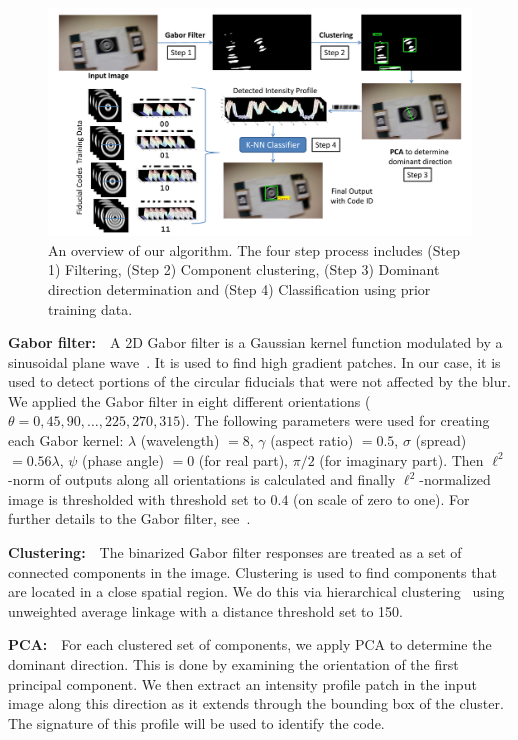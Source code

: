 \documentclass[10pt,twocolumn,letterpaper]{article}
\begin{document}
\begin{figure}[ht!]
  \centering
  \includegraphics[width=0.8\linewidth]{images/overall_flow.pdf}
  \caption{An overview of our algorithm.
    The four step process includes (Step 1) Filtering,
    (Step 2) Component clustering, (Step 3) Dominant direction determination
    and (Step 4) Classification using prior training data.}
  \label{fig:overall_flow}
\end{figure}

\textbf{Gabor filter:}~~A 2D Gabor filter is a Gaussian kernel function
modulated by a sinusoidal plane wave~\cite{Kruizinga:2002}. It is used to find
high gradient patches. In our case, it is used to detect portions
of the circular fiducials that were not affected by the blur.
We applied the Gabor filter in eight
different orientations ($\theta = 0, 45, 90, \ldots, 225, 270, 315$).  The
following parameters were used for creating each Gabor kernel: $\lambda$ (wavelength) $= 8$, $\gamma$
(aspect ratio) $= 0.5$, $\sigma$ (spread) $= 0.56\lambda$, $\psi$
(phase angle) $= 0$ (for real part), $\pi/2$ (for imaginary part).
Then $\ell^2$-norm of outputs along all orientations is calculated and finally
$\ell^2$-normalized image is thresholded with threshold set to $0.4$ (on scale of zero to
one).  For further details to the Gabor filter, see~\cite{Kruizinga:2002}.

\textbf{Clustering:}~~The binarized Gabor filter responses are
treated as a set of connected components in the image.   Clustering
is used to find components that are located in a close spatial region.  We do
this via hierarchical clustering~\cite{ALGLIB} using unweighted
average linkage with a distance threshold set to 150.

\textbf{PCA:}~~For each clustered set of components, we apply
PCA to determine the dominant direction.  This is done by examining
the orientation of the first principal component.  We then extract an
intensity profile patch in the input image along this direction as it
extends through the bounding box of the cluster. The signature of this
profile will be used to identify the code.
\end{document}
